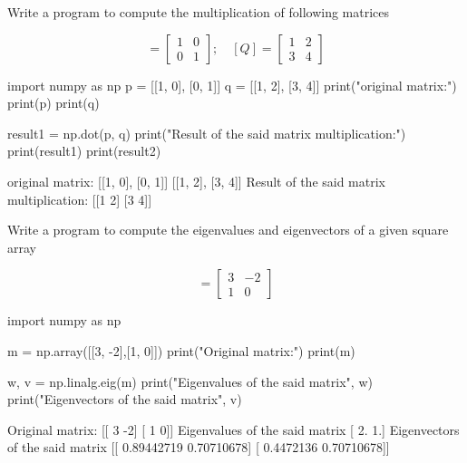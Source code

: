 \cprotEnv\begin{question}
Write a program to compute the multiplication of following matrices

\begin{equation*}
[P] = \begin{bmatrix}
1& 0\\
0& 1
\end{bmatrix};\quad
[Q] = \begin{bmatrix}
	1& 2\\
	3& 4
\end{bmatrix}
\end{equation*}
\end{question}

\cprotEnv\begin{solution}
\begin{ipython}
import numpy as np
p = [[1, 0], [0, 1]]
q = [[1, 2], [3, 4]]
print("original matrix:")
print(p)
print(q)

result1 = np.dot(p, q)
print("Result of the said matrix multiplication:")
print(result1)
print(result2)
\end{ipython}
\begin{ioutput}
original matrix:
[[1, 0], [0, 1]]
[[1, 2], [3, 4]]
Result of the said matrix multiplication:
[[1 2]
 [3 4]]
\end{ioutput}
\end{solution}

\cprotEnv\begin{question}
Write a program to compute the eigenvalues and eigenvectors of a given square array

\begin{equation*}
	[M] = \begin{bmatrix}
		3& -2\\
		1& 0
	\end{bmatrix}
\end{equation*}
\end{question}

\cprotEnv\begin{solution}
\begin{ipython}
import numpy as np

m = np.array([[3, -2],[1, 0]])
print("Original matrix:")
print(m)

w, v = np.linalg.eig(m) 
print("Eigenvalues of the said matrix", w)
print("Eigenvectors of the said matrix", v)
\end{ipython}
\begin{ioutput}

Original matrix:
[[ 3 -2]
 [ 1  0]]
Eigenvalues of the said matrix [ 2.  1.]
Eigenvectors of the said matrix [[ 0.89442719  0.70710678]
                                 [ 0.4472136   0.70710678]]
\end{ioutput}
\end{solution}

